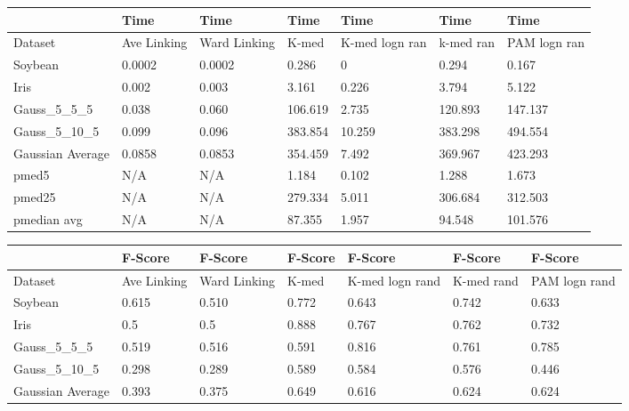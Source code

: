 \documentclass{article}
\begin{document}
\begin{figure*}[h]
\label{fig:hier_results}
\small
\begin{tabular}{ | l | l | l | l | l | l | l | }
\hline
	   & Time & Time & Time & Time & Time & Time \\ \hline
	Dataset & Ave Linking & Ward Linking & K-med & K-med logn ran & k-med ran & PAM logn ran \\ \hline
	Soybean & 0.0002 & 0.0002 & 0.286 & 0 & 0.294 & 0.167 \\ 
	Iris & 0.002 & 0.003 & 3.161 & 0.226 & 3.794 & 5.122 \\ 
	Gauss\_5\_5\_5 & 0.038 & 0.060 & 106.619 & 2.735 &120.893 & 147.137 \\
	Gauss\_5\_10\_5 & 0.099 & 0.096 & 383.854 & 10.259 & 383.298 & 494.554 \\
	Gaussian Average & 0.0858 & 0.0853 & 354.459 & 7.492 & 369.967 & 423.293 \\ 
	pmed5 &  N/A & N/A & 1.184 & 0.102 & 1.288 & 1.673   \\ 
	pmed25 & N/A & N/A & 279.334 & 5.011 & 306.684 & 312.503   \\ 
	pmedian avg & N/A & N/A &  87.355 & 1.957 & 94.548 & 101.576   \\ \hline
\end{tabular}
\vspace{0.2 cm}

\begin{tabular}{ | l | l | l | l | l | l | l | }
\hline
	   & F-Score & F-Score & F-Score & F-Score & F-Score & F-Score \\ \hline
	Dataset & Ave Linking & Ward Linking & K-med & K-med logn rand & K-med rand & PAM logn rand \\ \hline
	Soybean & 0.615 & 0.510 & 0.772 & 0.643 & 0.742 & 0.633 \\ 
	Iris & 0.5 & 0.5 & 0.888 & 0.767 & 0.762 & 0.732 \\ 
	Gauss\_5\_5\_5 & 0.519 & 0.516 & 0.591 & 0.816 & 0.761 & 0.785 \\
	Gauss\_5\_10\_5 & 0.298 & 0.289 & 0.589 & 0.584 & 0.576 & 0.446 \\
	Gaussian Average & 0.393 & 0.375 & 0.649 & 0.616 & 0.624 & 0.624 \\ \hline
\end{tabular}
\vspace{0.2 cm}


\end{figure*}
\end{document}
